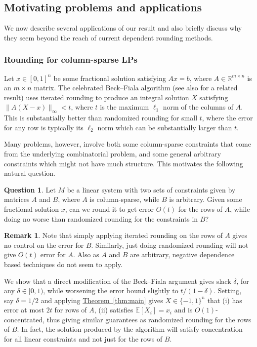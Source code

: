 \documentclass[11pt]{article}
\newcommand{\E}{\mathbb{E}}
\theoremstyle{definition}
\newtheorem{remark}[theorem]{Remark}
\newcommand{\expref}[2]{\texorpdfstring{\hyperref[#2]{#1~\ref{#2}}}{#1~\ref{#2}}}
\newcommand{\R}{{\mathbb R}}
\newtheorem{question}[theorem]{Question}
\begin{document}
%
%


%
\subsection{Motivating problems and applications}    %
\label{s:appl}
We now describe several applications of our result and also briefly discuss why they seem beyond the reach of current dependent rounding methods.
\subsubsection{Rounding  for column-sparse LPs}
Let $x \in [0,1]^n$ be some fractional solution satisfying $Ax = b$, where $A \in \R^{m \times n}$ is an $m \times n$ matrix.
The celebrated Beck--Fiala algorithm \cite{BF81} (see also \cite{KarpLRTVV87} for a related result) uses iterated rounding to produce an integral solution $X$ satisfying $\|A(X-x)\|_\infty < t$, where $t$ is the maximum $\ell_1$ norm of the columns of $A$. This is substantially better than randomized rounding for small $t$, where the error for any row is typically its $\ell_2$ norm which can be substantially larger than $t$.

Many problems, however, involve both some column-sparse constraints that come from the underlying combinatorial problem, and some general arbitrary constraints which might not have much structure. This motivates the following natural question.

\begin{question} Let $M$ be a linear system with two sets of constraints given by matrices $A$ and $B$, where $A$ is column-sparse, while $B$ is arbitrary. Given some fractional solution $x$, can we round it to
get error $O(t)$ for the rows of $A$, while doing no worse than randomized rounding for the constraints in $B$?
\end{question}
\begin{remark}
Note that simply applying iterated rounding on the rows of $A$ gives no control on the error for $B$. Similarly, just doing randomized rounding will not give $O(t)$ error for $A$. Also as $A$ and $B$ are arbitrary, negative dependence based techniques do not seem to apply.
\end{remark}

%

 We show that a direct modification of the Beck--Fiala argument gives slack $\delta$, for any $\delta \in [0,1)$, while worsening the   error bound slightly to $t/(1-\delta)$. Setting, say $\delta=1/2$ and applying \expref{Theorem}{thm:main} gives $X \in \{-1,1\}^n$ that (i) has error at most $2t$ for rows of $A$, (ii) satisfies $\E[X_i]=x_i$ and is $O(1)$-concentrated, thus giving similar guarantees as randomized rounding for the rows of $B$.
In fact, the solution produced by the algorithm will satisfy concentration for all linear constraints and not just for the rows of $B$.
%
\end{document}

